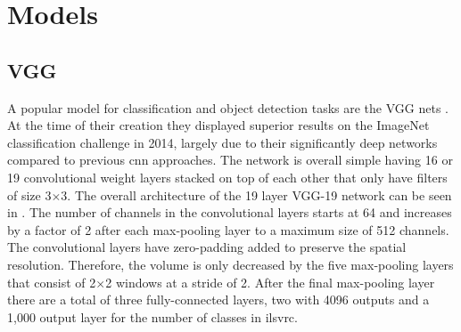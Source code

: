 \section{Models}

\subsection{VGG}
A popular model for classification and object detection tasks are the VGG nets \cite{vgg}. At the time of their creation they displayed superior results on the ImageNet classification challenge in 2014, largely due to their significantly deep networks compared to previous \gls{cnn} approaches. The network is overall simple having 16 or 19 convolutional weight layers stacked on top of each other that only have filters of size 3$\times$3. The overall architecture of the 19 layer VGG-19 network can be seen in . The number of channels in the convolutional layers starts at 64 and increases by a factor of 2 after each max-pooling layer to a maximum size of 512 channels. The convolutional layers have zero-padding added to preserve the spatial resolution. Therefore, the volume is only decreased by the five max-pooling layers that consist of 2$\times$2 windows at a stride of 2. After the final max-pooling layer there are a total of three fully-connected layers, two with 4096 outputs and a 1,000 output layer for the number of classes in \gls{ilsvrc}.

